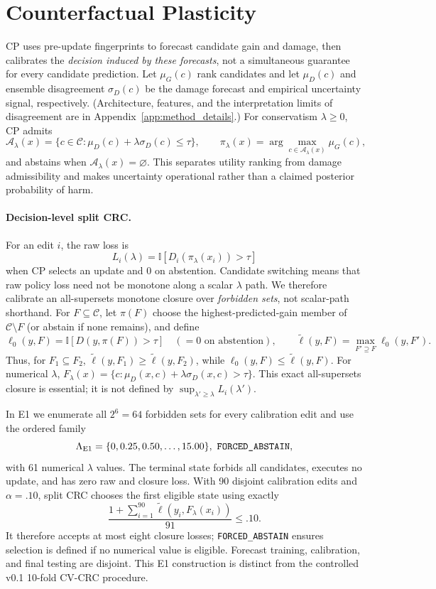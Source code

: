 \documentclass{article} %
\begin{document}
\section{Counterfactual Plasticity}
\label{sec:method}

CP uses pre-update fingerprints to forecast candidate gain and damage, then
calibrates the \emph{decision induced by these forecasts}, not a simultaneous
guarantee for every candidate prediction. Let $\mu_G(c)$ rank candidates and
let $\mu_D(c)$ and ensemble disagreement $\sigma_D(c)$ be the damage forecast
and empirical uncertainty signal, respectively. (Architecture, features, and
the interpretation limits of disagreement are in
Appendix~\ref{app:method_details}.) For conservatism $\lambda\geq0$, CP admits
\[
\mathcal A_\lambda(x)=\{c\in\mathcal C:
\mu_D(c)+\lambda\sigma_D(c)\leq\tau\},\qquad
\pi_\lambda(x)=\arg\max_{c\in\mathcal A_\lambda(x)}\mu_G(c),
\]
and abstains when $\mathcal A_\lambda(x)=\varnothing$. This separates utility
ranking from damage admissibility and makes uncertainty operational rather
than a claimed posterior probability of harm.

\paragraph{Decision-level split CRC.}
For an edit $i$, the raw loss is
\[
L_i(\lambda)=\mathbb I[D_i(\pi_\lambda(x_i))>\tau]
\]
when CP selects an update and $0$ on abstention. Candidate switching means
that raw policy loss need not be monotone along a scalar $\lambda$ path. We
therefore calibrate an all-supersets monotone closure over \emph{forbidden
sets}, not scalar-path shorthand. For $F\subseteq\mathcal C$, let $\pi(F)$
choose the highest-predicted-gain member of $\mathcal C\setminus F$ (or
abstain if none remains), and define
\[
\ell_0(y,F)=\mathbb I[D(y,\pi(F))>\tau]\quad(=0\text{ on abstention}),
\qquad
\widetilde\ell(y,F)=\max_{F'\supseteq F}\ell_0(y,F').
\]
Thus, for $F_1\subseteq F_2$, $\widetilde\ell(y,F_1)\geq
\widetilde\ell(y,F_2)$, while $\ell_0(y,F)\leq\widetilde\ell(y,F)$.
For numerical $\lambda$, $F_\lambda(x)=\{c:\mu_D(x,c)+
\lambda\sigma_D(x,c)>\tau\}$. This exact all-supersets closure is essential;
it is not defined by $\sup_{\lambda'\geq\lambda}L_i(\lambda')$.

In E1 we enumerate all $2^6=64$ forbidden sets for every calibration edit and
use the ordered family
\[
\Lambda_{\rm E1}=\{0,0.25,0.50,\ldots,15.00\},\ \texttt{FORCED\_ABSTAIN},
\]
with 61 numerical $\lambda$ values. The terminal state forbids all candidates,
executes no update, and has zero raw and closure loss. With 90 disjoint
calibration edits and $\alpha=.10$, split CRC chooses the first eligible state
using exactly
\[
\frac{1+\sum_{i=1}^{90}\widetilde\ell(y_i,F_\lambda(x_i))}{91}\leq .10.
\]
It therefore accepts at most eight closure losses; \texttt{FORCED\_ABSTAIN}
ensures selection is defined if no numerical value is eligible. Forecast
training, calibration, and final testing are disjoint. This E1 construction is
distinct from the controlled v0.1 10-fold CV-CRC procedure.
\end{document}
